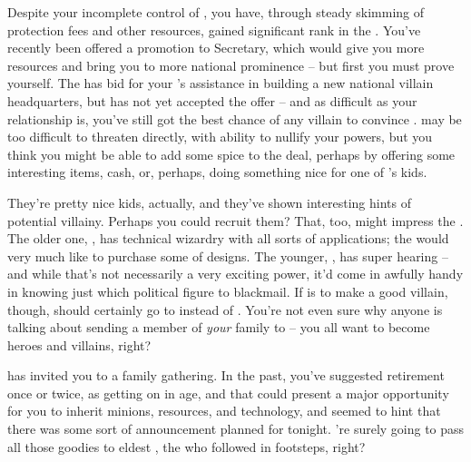 \documentclass[char]{LRSguildcamp1}
\begin{document}
Despite your incomplete control of \pCityO{}, you have, through steady skimming of protection fees and other resources, gained significant rank in the \cVillainCompact{\intro}.  You've recently been offered a promotion to Secretary, which would give you more resources and bring you to more national prominence -- but first you must prove yourself.  The \cVillainCompact{} has bid for your \cArchitect{\sibling} \cArchitect{}'s assistance in building a new national villain headquarters, but \cArchitect{} has not yet accepted the offer -- and as difficult as your relationship is, you've still got the best chance of any villain to convince \cArchitect{\them}.  \cArchitect{} may be too difficult to threaten directly, with \cArchitect{\their} ability to nullify your powers, but you think you might be able to add some spice to the deal, perhaps by offering some interesting items, cash, or, perhaps, doing something nice for one of \cArchitect{}'s kids.  

They're pretty nice kids, actually, and they've shown interesting hints of potential villainy.  Perhaps you could recruit them?  That, too, might impress the \cVillainCompact{}.  The older one, \cTeen{}, has technical wizardry with all sorts of applications; the \cVillainCompact{} would very much like to purchase some of \cTeen{\their} designs.  The younger, \cTween{}, has super hearing -- and while that's not necessarily a very exciting power, it'd come in awfully handy in knowing just which political figure to blackmail.  If \cTween{} is to make a good villain, though, \cTween{\they} should certainly go to \pSuperSchool{} instead of \pNormalSchool{}.  You're not even sure why anyone is talking about sending a member of {\em your} family to \pNormalSchool{} -- you all want to become heroes and villains, right?

\cGrandma{} has invited you to a family gathering.  In the past, you've suggested retirement once or twice, as \cGrandma{\theyare} getting on in age, and that could present a major opportunity for you to inherit \cGrandma{\their} minions, resources, and technology, and \cGrandma{} seemed to hint that there was some sort of announcement planned for tonight.  \cGrandma{\They}'re surely going to pass all those goodies to \cGrandma{\their} eldest \cOldest{\offspring}, the \cOldest{\villain} who followed in \cGrandma{\their} footsteps, right?
\end{document}
